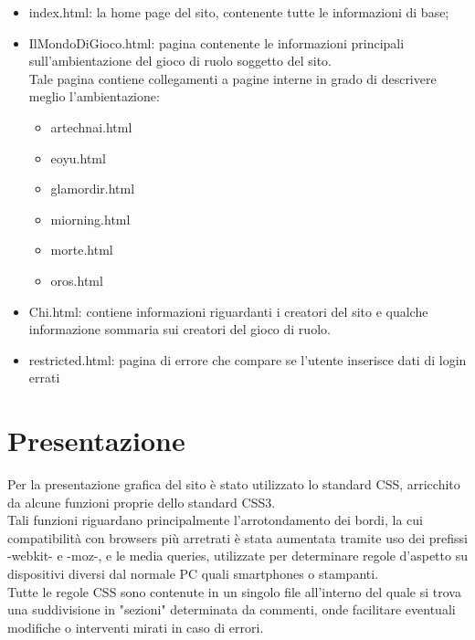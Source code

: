 \documentclass{article}
\begin{document}
			\begin{itemize}
		\item index.html: la home page del sito, contenente tutte le informazioni di base;\\
		\item IlMondoDiGioco.html: pagina contenente le informazioni principali sull'ambientazione del gioco di ruolo soggetto del sito.\\
		 Tale pagina contiene collegamenti a pagine interne in grado di descrivere meglio l'ambientazione:\\
		 \begin{itemize}
			\item artechnai.html\\
			\item eoyu.html\\
			\item glamordir.html\\
			\item miorning.html\\
			\item morte.html\\
			\item oros.html\\
			
		\end{itemize}
		\item Chi.html: contiene informazioni riguardanti i creatori del sito e qualche informazione sommaria sui creatori del gioco di ruolo.\\
		\item restricted.html: pagina di errore che compare se l'utente inserisce dati di login errati\\
		\end{itemize}

 \newpage

\section{Presentazione}
	Per la presentazione grafica del sito è stato utilizzato lo standard CSS, arricchito da alcune funzioni proprie dello standard CSS3.\\ Tali funzioni riguardano principalmente l'arrotondamento dei bordi, la cui compatibilità con browsers più arretrati è stata aumentata tramite uso dei prefissi -webkit- e -moz-, e le media queries, utilizzate per determinare regole d'aspetto su dispositivi diversi dal normale PC quali smartphones o stampanti.\\
	Tutte le regole CSS sono contenute in un singolo file all'interno del quale si trova una suddivisione in "sezioni" determinata da commenti, onde facilitare eventuali modifiche o interventi mirati in caso di errori.\\
	
\end{document}
